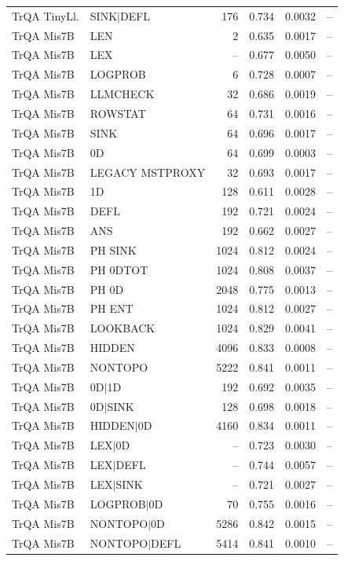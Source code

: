 \begin{longtable}{llrrrr}
TrQA TinyLl. & SINK$\mid$DEFL & 176 & 0.734 & 0.0032 & -- \\
TrQA Mis7B & LEN & 2 & 0.635 & 0.0017 & -- \\
TrQA Mis7B & LEX & -- & 0.677 & 0.0050 & -- \\
TrQA Mis7B & LOGPROB & 6 & 0.728 & 0.0007 & -- \\
TrQA Mis7B & LLMCHECK & 32 & 0.686 & 0.0019 & -- \\
TrQA Mis7B & ROWSTAT & 64 & 0.731 & 0.0016 & -- \\
TrQA Mis7B & SINK & 64 & 0.696 & 0.0017 & -- \\
TrQA Mis7B & 0D & 64 & 0.699 & 0.0003 & -- \\
TrQA Mis7B & LEGACY MSTPROXY & 32 & 0.693 & 0.0017 & -- \\
TrQA Mis7B & 1D & 128 & 0.611 & 0.0028 & -- \\
TrQA Mis7B & DEFL & 192 & 0.721 & 0.0024 & -- \\
TrQA Mis7B & ANS & 192 & 0.662 & 0.0027 & -- \\
TrQA Mis7B & PH SINK & 1024 & 0.812 & 0.0024 & -- \\
TrQA Mis7B & PH 0DTOT & 1024 & 0.808 & 0.0037 & -- \\
TrQA Mis7B & PH 0D & 2048 & 0.775 & 0.0013 & -- \\
TrQA Mis7B & PH ENT & 1024 & 0.812 & 0.0027 & -- \\
TrQA Mis7B & LOOKBACK & 1024 & 0.829 & 0.0041 & -- \\
TrQA Mis7B & HIDDEN & 4096 & 0.833 & 0.0008 & -- \\
TrQA Mis7B & NONTOPO & 5222 & 0.841 & 0.0011 & -- \\
TrQA Mis7B & 0D$\mid$1D & 192 & 0.692 & 0.0035 & -- \\
TrQA Mis7B & 0D$\mid$SINK & 128 & 0.698 & 0.0018 & -- \\
TrQA Mis7B & HIDDEN$\mid$0D & 4160 & 0.834 & 0.0011 & -- \\
TrQA Mis7B & LEX$\mid$0D & -- & 0.723 & 0.0030 & -- \\
TrQA Mis7B & LEX$\mid$DEFL & -- & 0.744 & 0.0057 & -- \\
TrQA Mis7B & LEX$\mid$SINK & -- & 0.721 & 0.0027 & -- \\
TrQA Mis7B & LOGPROB$\mid$0D & 70 & 0.755 & 0.0016 & -- \\
TrQA Mis7B & NONTOPO$\mid$0D & 5286 & 0.842 & 0.0015 & -- \\
TrQA Mis7B & NONTOPO$\mid$DEFL & 5414 & 0.841 & 0.0010 & -- \\

\end{longtable}
